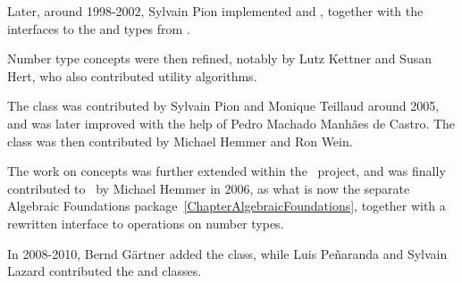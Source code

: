 Later, around 1998-2002, Sylvain Pion implemented 
 and , together with the interfaces to
the  and  types from \gmp.

Number type concepts were then refined, notably by Lutz Kettner and
Susan Hert, who also contributed utility algorithms.

The  class was contributed by Sylvain Pion and Monique Teillaud
around 2005, and was later improved with the help of Pedro Machado Manh\~aes
de Castro.  The class  was then contributed by Michael
Hemmer and Ron Wein.

The work on concepts was further extended within the \exacus\ project, and was finally
contributed to \cgal\ by Michael Hemmer in 2006, as what is now the separate
Algebraic Foundations package~\ref{ChapterAlgebraicFoundations}, together with
a rewritten interface to operations on number types.

In 2008-2010, Bernd G\"artner added the  class, while
Luis Pe\~naranda and Sylvain Lazard contributed the  and
 classes.



%
%


% 
